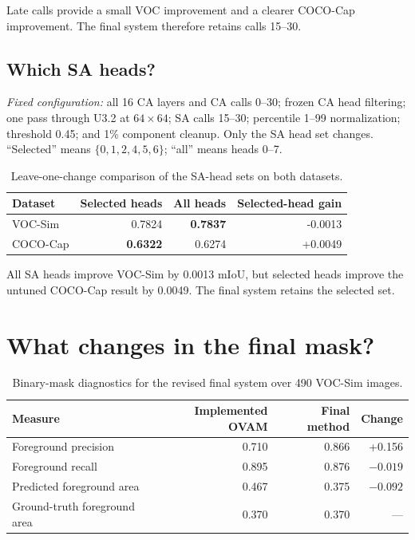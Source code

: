 \documentclass[10pt,a4paper]{article}
\begin{document}
Late calls provide a small VOC improvement and a clearer COCO-Cap improvement.
The final system therefore retains calls 15--30.

\subsection{Which SA heads?}

\textit{Fixed configuration:} all 16 CA layers and CA calls 0--30; frozen CA
head filtering; one pass through U3.2 at $64\times64$; SA calls 15--30;
percentile 1--99 normalization; threshold 0.45; and 1\% component cleanup.
Only the SA head set changes.  ``Selected'' means
$\{0,1,2,4,5,6\}$; ``all'' means heads 0--7.

\begin{table}[H]\centering\small
\begin{tabular}{lrrr}
\toprule
Dataset & Selected heads & All heads & Selected-head gain \\
\midrule
VOC-Sim & 0.7824 & \textbf{0.7837} & -0.0013 \\
COCO-Cap & \textbf{0.6322} & 0.6274 & +0.0049 \\
\bottomrule
\end{tabular}
\caption{Leave-one-change comparison of the SA-head sets on both datasets.}
\end{table}

All SA heads improve VOC-Sim by 0.0013 mIoU, but selected heads improve the
untuned COCO-Cap result by 0.0049.  The final system retains the selected set.

\section{What changes in the final mask?}

\begin{table}[H]\centering
\begin{tabular}{lrrr}
\toprule
Measure & Implemented OVAM & Final method & Change \\
\midrule
Foreground precision & 0.710 & 0.866 & +0.156 \\
Foreground recall & 0.895 & 0.876 & $-0.019$ \\
Predicted foreground area & 0.467 & 0.375 & $-0.092$ \\
Ground-truth foreground area & 0.370 & 0.370 & --- \\
\bottomrule
\end{tabular}
\caption{Binary-mask diagnostics for the revised final system over 490
VOC-Sim images.}
\end{table}
\end{document}
